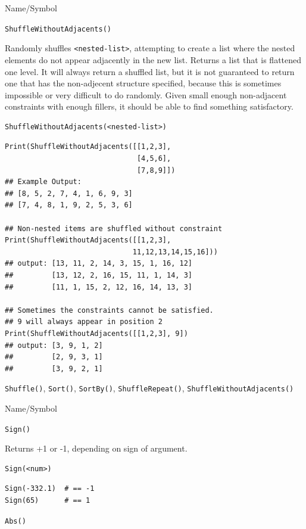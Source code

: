 \begin{desc}{Name/Symbol}
\item[Name/Symbol] 	\verb+ShuffleWithoutAdjacents()+

\item[Description] 	Randomly shuffles  \verb+<nested-list>+, attempting to
  create a list where the nested elements do not appear adjacently in
  the new list. Returns a list that is flattened one level. It will
  always return a shuffled list, but it is not guaranteed to return
  one that has the non-adjecent structure specified, because this is
  sometimes impossible or very difficult to do randomly.  Given small
  enough non-adjacent constraints with enough fillers, it should be
  able to find something satisfactory.

\item[Usage]    
\begin{verbatim}
ShuffleWithoutAdjacents(<nested-list>)
\end{verbatim}

\item[Example]

\begin{verbatim}
Print(ShuffleWithoutAdjacents([[1,2,3],
                               [4,5,6],
                               [7,8,9]])
## Example Output: 
## [8, 5, 2, 7, 4, 1, 6, 9, 3]
## [7, 4, 8, 1, 9, 2, 5, 3, 6]

## Non-nested items are shuffled without constraint
Print(ShuffleWithoutAdjacents([[1,2,3], 
                              11,12,13,14,15,16]))
## output: [13, 11, 2, 14, 3, 15, 1, 16, 12]
##         [13, 12, 2, 16, 15, 11, 1, 14, 3]
##         [11, 1, 15, 2, 12, 16, 14, 13, 3]

## Sometimes the constraints cannot be satisfied.  
## 9 will always appear in position 2
Print(ShuffleWithoutAdjacents([[1,2,3], 9])
## output: [3, 9, 1, 2]
##         [2, 9, 3, 1]
##         [3, 9, 2, 1]
\end{verbatim}

\item[See Also]    	\verb+Shuffle()+, \verb+Sort()+, \verb+SortBy()+,
        \verb+ShuffleRepeat()+, \verb+ShuffleWithoutAdjacents()+
\end{desc}

\begin{desc}{Name/Symbol}
\item[Name/Symbol] 	\verb+Sign()+

\item[Description] 	Returns +1 or -1, depending on sign of argument.

\item[Usage]
\begin{verbatim}
Sign(<num>)
\end{verbatim}

\item[Example]
\begin{verbatim}
Sign(-332.1)  # == -1
Sign(65)      # == 1

\end{verbatim}

\item[See Also]     	\verb+Abs()+
\end{desc}

